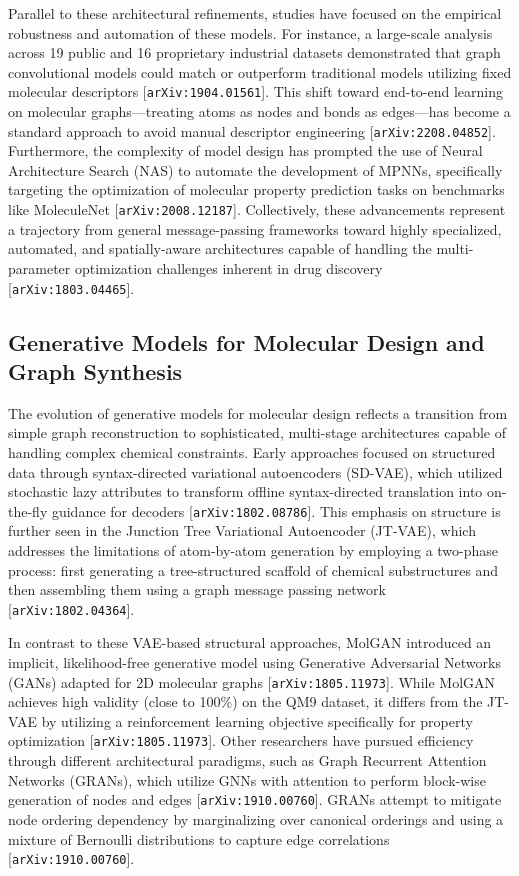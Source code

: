 \documentclass[11pt]{article}
\begin{document}
Parallel to these architectural refinements, studies have focused on the empirical robustness and automation of these models. For instance, a large-scale analysis across 19 public and 16 proprietary industrial datasets demonstrated that graph convolutional models could match or outperform traditional models utilizing fixed molecular descriptors [\texttt{arXiv:1904.01561}]. This shift toward end-to-end learning on molecular graphs—treating atoms as nodes and bonds as edges—has become a standard approach to avoid manual descriptor engineering [\texttt{arXiv:2208.04852}]. Furthermore, the complexity of model design has prompted the use of Neural Architecture Search (NAS) to automate the development of MPNNs, specifically targeting the optimization of molecular property prediction tasks on benchmarks like MoleculeNet [\texttt{arXiv:2008.12187}]. Collectively, these advancements represent a trajectory from general message-passing frameworks toward highly specialized, automated, and spatially-aware architectures capable of handling the multi-parameter optimization challenges inherent in drug discovery [\texttt{arXiv:1803.04465}].

\subsection{Generative Models for Molecular Design and Graph Synthesis}

The evolution of generative models for molecular design reflects a transition from simple graph reconstruction to sophisticated, multi-stage architectures capable of handling complex chemical constraints. Early approaches focused on structured data through syntax-directed variational autoencoders (SD-VAE), which utilized stochastic lazy attributes to transform offline syntax-directed translation into on-the-fly guidance for decoders [\texttt{arXiv:1802.08786}]. This emphasis on structure is further seen in the Junction Tree Variational Autoencoder (JT-VAE), which addresses the limitations of atom-by-atom generation by employing a two-phase process: first generating a tree-structured scaffold of chemical substructures and then assembling them using a graph message passing network [\texttt{arXiv:1802.04364}].

In contrast to these VAE-based structural approaches, MolGAN introduced an implicit, likelihood-free generative model using Generative Adversarial Networks (GANs) adapted for 2D molecular graphs [\texttt{arXiv:1805.11973}]. While MolGAN achieves high validity (close to 100\%) on the QM9 dataset, it differs from the JT-VAE by utilizing a reinforcement learning objective specifically for property optimization [\texttt{arXiv:1805.11973}]. Other researchers have pursued efficiency through different architectural paradigms, such as Graph Recurrent Attention Networks (GRANs), which utilize GNNs with attention to perform block-wise generation of nodes and edges [\texttt{arXiv:1910.00760}]. GRANs attempt to mitigate node ordering dependency by marginalizing over canonical orderings and using a mixture of Bernoulli distributions to capture edge correlations [\texttt{arXiv:1910.00760}].
\end{document}
